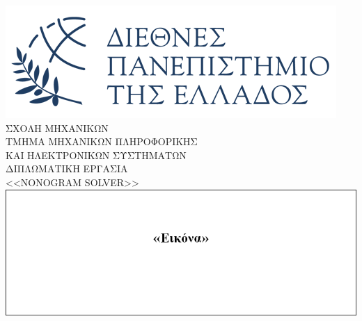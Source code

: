 \documentclass[twoside, a4paper, 11pt]{article}
\begin{document}

\begin{titlepage}

\newcommand{\HRule}{\rule{\linewidth}{0.6mm}}
\center
\includegraphics[scale=0.6]{Images/ihu-logo-gr.png}\\[1cm]

\textsc{\huge ΣΧΟΛΗ ΜΗΧΑΝΙΚΩΝ}\\

\textsc{\huge ΤΜΗΜΑ ΜΗΧΑΝΙΚΩΝ ΠΛΗΡΟΦΟΡΙΚΗΣ \\ ΚΑΙ ΗΛΕΚΤΡΟΝΙΚΩΝ ΣΥΣΤΗΜΑΤΩΝ}\\[1.5cm] %

\textsc{\huge ΔΙΠΛΩΜΑΤΙΚΗ ΕΡΓΑΣΙΑ}\\[0.2cm]
{\huge <<NONOGRAM SOLVER>>}\\[1cm]

\includegraphics[scale=0.8]{Images/Cover-Image-Placeholder.png}\\[1cm]


\end{titlepage}
\end{document}
